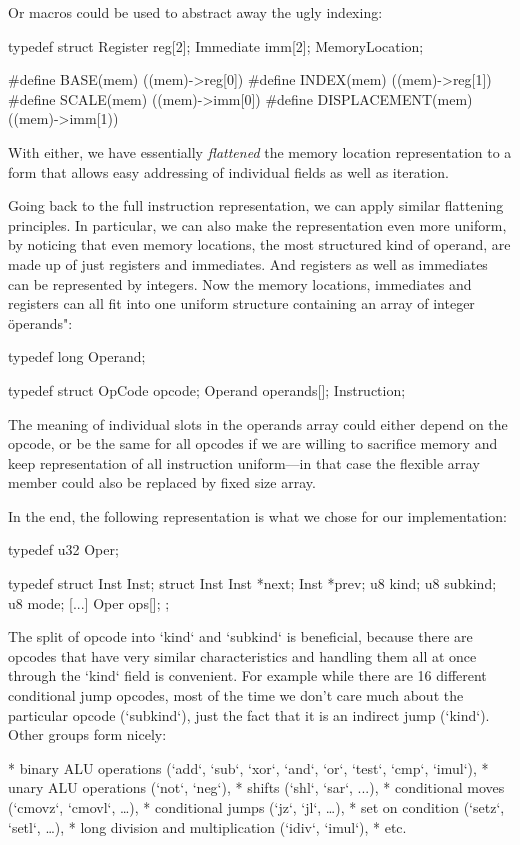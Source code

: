 Or macros could be used to abstract away the ugly indexing:

\begtt
typedef struct {
	Register reg[2];
	Immediate imm[2];
} MemoryLocation;

#define BASE(mem)         ((mem)->reg[0])
#define INDEX(mem)        ((mem)->reg[1])
#define SCALE(mem)        ((mem)->imm[0])
#define DISPLACEMENT(mem) ((mem)->imm[1))
\endtt

With either, we have essentially {\em flattened} the memory location
representation to a form that allows easy addressing of individual fields as
well as iteration.

Going back to the full instruction representation, we can apply similar
flattening principles. In particular, we can also make the representation even
more uniform, by noticing that even memory locations, the most structured kind
of operand, are made up of just registers and immediates. And registers as well
as immediates can be represented by integers. Now the memory locations,
immediates and registers can all fit into one uniform structure containing an
array of integer \"operands":

\begtt
typedef long Operand;

typedef struct {
	OpCode opcode;
	Operand operands[];
} Instruction;
\endtt

The meaning of individual slots in the operands array could either depend on the
opcode, or be the same for all opcodes if we are willing to sacrifice memory and
keep representation of all instruction uniform---in that case the flexible array
member could also be replaced by fixed size array.

In the end, the following representation is what we chose for our implementation:

\begtt
typedef u32 Oper;

typedef struct Inst Inst;
struct Inst {
	Inst *next;
	Inst *prev;
	u8 kind;
	u8 subkind;
	u8 mode;
	[...]
	Oper ops[];
};
\endtt

The split of opcode into `kind` and `subkind` is beneficial, because there are
opcodes that have very similar characteristics and handling them all at once
through the `kind` field is convenient. For example while there are 16 different
conditional jump opcodes, most of the time we don't care much about the
particular opcode (`subkind`), just the fact that it is an indirect jump
(`kind`). Other groups form nicely:

\begitems
* binary ALU operations (`add`, `sub`, `xor`, `and`, `or`, `test`, `cmp`, `imul`),
* unary ALU operations (`not`, `neg`),
* shifts (`shl`, `sar`, ...),
* conditional moves (`cmovz`, `cmovl`, \dots),
* conditional jumps (`jz`, `jl`, \dots),
* set on condition (`setz`, `setl`, \dots),
* long division and multiplication (`idiv`, `imul`),
* etc.
\enditems

